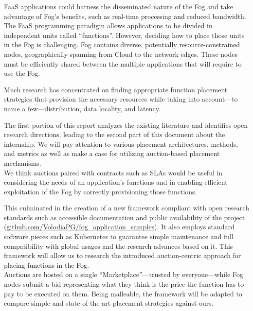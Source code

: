 \Gls{FaaS} applications could harness the disseminated nature of the Fog and take advantage of Fog’s benefits, such as real-time processing and reduced bandwidth. The \gls{FaaS} programming paradigm allows applications to be divided in independent units called “functions”. However, deciding how to place those units in the Fog is challenging. Fog contains diverse, potentially resource-constrained nodes, geographically spanning from Cloud to the network edges. These nodes must be efficiently shared between the multiple applications that will require to use the Fog.

Much research has concentrated on finding appropriate function placement strategies that provision the necessary resources while taking into account—to name a few—distribution, data locality, and latency.

The first portion of this report analyzes the existing literature and identifies open research directions, leading to the second part of this document about the internship. We will pay attention to various placement architectures, methods, and metrics as well as make a case for utilizing auction-based placement mechanisms.\\
We think auctions paired with contracts such as \glspl{SLA} would be useful in considering the needs of an application’s functions and in enabling efficient exploitation of the Fog by correctly provisioning those functions.

This culminated in the creation of a new framework compliant with open research standards such as accessible documentation and public availability of the project (\href{https://github.com/VolodiaPG/fog_application_samples}{github.com/VolodiaPG/fog\_application\_samples}). It also employs standard software pieces such as Kubernetes to guarantee simple maintenance and full compatibility with global usages and the research advances based on it. This framework will allow us to research the introduced auction-centric approach for placing functions in the Fog.\\
Auctions are hosted on a single “Marketplace”—trusted by everyone—while Fog nodes submit a bid representing what they think is the price the function has to pay to be executed on them. Being malleable, the framework will be adapted to compare simple and state-of-the-art placement strategies against ours.

